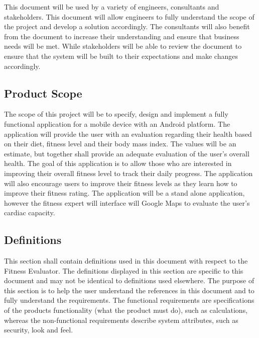 \documentclass[12pt,letterpaper]{article}
\begin{document}
This document will be used by a variety of engineers, consultants and stakeholders. This document will allow engineers to fully understand the scope of the project and develop a solution accordingly. The consultants will also benefit from the document to increase their understanding and ensure that business needs will be met. While stakeholders will be able to review the document to ensure that the system will be built to their expectations and make changes accordingly.

\subsection{Product Scope}
The scope of this project will be to specify, design and implement a fully functional application for a mobile device with an Android platform. The application will provide the user with an evaluation regarding their health based on their diet, fitness level and their body mass index. The values will be an estimate, but together shall provide an adequate evaluation of the user's overall health. The goal of this application is to allow those who are interested in improving their overall fitness level to track their daily progress. The application will also encourage users to improve their fitness levels as they learn how to improve their fitness rating. The application will be a stand alone application, however the fitness expert will interface will Google Maps to evaluate the user's cardiac capacity.

\subsection{Definitions}
This section shall contain definitions used in this document with respect to the Fitness Evaluator. The definitions displayed in this section are specific to this document and may not be identical to definitions used elsewhere. The purpose of this section is to help the user understand the references in this document and to fully understand the requirements. The functional requirements are specifications of the products functionality (what the product must do), such as calculations, whereas the non-functional requirements describe system attributes, such as security, look and feel.
\end{document}
